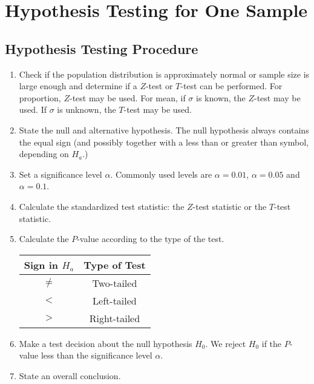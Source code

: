 
\hypertarget{hypothesis-testing-for-one-sample}{%
\section{Hypothesis Testing for One
Sample}\label{hypothesis-testing-for-one-sample}}

\hypertarget{hypothesis-testing-procedure}{%
\subsection{Hypothesis Testing
Procedure}\label{hypothesis-testing-procedure}}

\begin{enumerate}[sepno]
\item
  Check if the population distribution is approximately normal or sample size is large enough and determine if a \(Z\)-test
  or \(T\)-test can be performed. For proportion, \(Z\)-test may be
  used. For mean, if \(\sigma\) is known, the \(Z\)-test may be used. If
  \(\sigma\) is unknown, the \(T\)-test may be used.
\item
  State the null and alternative hypothesis. The null hypothesis always
  contains the equal sign (and possibly together with a less than or
  greater than symbol, depending on \(H_a\).)
\item
  Set a significance level \(\alpha\). Commonly used levels are
  \(\alpha=0.01\), \(\alpha=0.05\) and \(\alpha=0.1\).
\item
  Calculate the standardized test statistic: the \(Z\)-test statistic or
  the \(T\)-test statistic.
\item
  Calculate the \(P\)-value according to the type of the test.

  \begin{tabular}{cc}
    \toprule
    Sign in \(H_a\) & Type of Test\\
    \midrule
    \(\ne\) & Two-tailed\\
    \(<\) &  Left-tailed\\
    \(>\) & Right-tailed\\
    \bottomrule
  \end{tabular}
  
\item
  Make a test decision about the null hypothesis \(H_0\). We reject
  \(H_0\) if the \(P\)-value less than the significance level
  \(\alpha\).
\item
  State an overall conclusion.
\end{enumerate}
\vspace*{-0.5\baselineskip}

